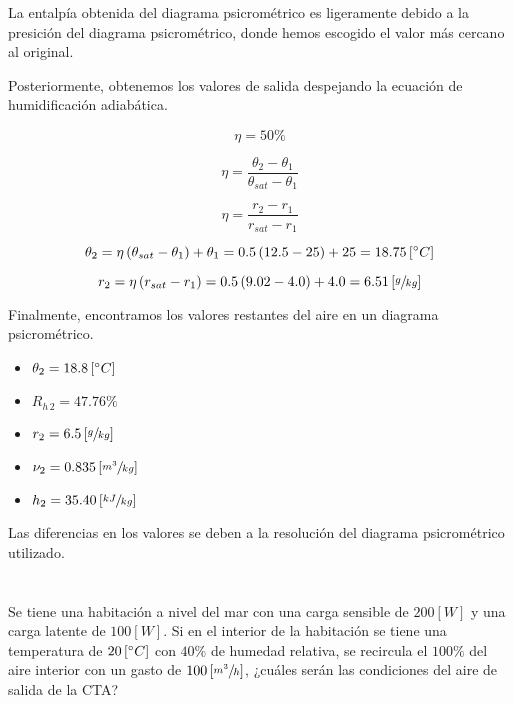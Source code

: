 \documentclass[11pt]{article}
\begin{document}
La entalpía obtenida del diagrama psicrométrico es ligeramente debido a la presición del diagrama psicrométrico, donde hemos escogido el valor más cercano al original.

Posteriormente, obtenemos los valores de salida despejando la ecuación de humidificación adiabática.

\[ \eta = 50 \% \]

\[ \eta = \frac{ \theta _2 - \theta _1 }{ \theta _ { sat } - \theta _1 } \]

\[ \eta = \frac{ r_2 - r_1 }{ r_{ sat } - r_1 } \]

\[ \theta _2 = \eta \left( \theta _{ sat } - \theta _1 \right) + \theta _1 = 0.5 \left( 12.5 - 25 \right) + 25 = 18.75 \left[ \degree C \right] \]

\[ r_2 = \eta \left( r_{ sat } - r_1 \right) = 0.5 \left( 9.02 - 4.0 \right) + 4.0 = 6.51 \left[ \sfrac{ g }{ kg } \right] \]

Finalmente, encontramos los valores restantes del aire en un diagrama psicrométrico.

\begin{itemize}
    \item
    $ \theta _2 = 18.8 \left[ \degree C \right] $
    
    \item
    $ R_{ h \, 2 } = 47.76\% $
    
    \item
    $ r_2 = 6.5 \left[ \sfrac{ g }{ kg } \right] $
    
    \item
    $ \nu_2 = 0.835 \left[ \sfrac{ m^3 }{ kg } \right] $
    
    \item
    $ h_2 = 35.40 \left[ \sfrac{ kJ }{ kg } \right] $

\end{itemize}

Las diferencias en los valores se deben a la resolución del diagrama psicrométrico utilizado.

\section{}

Se tiene una habitación a nivel del mar con una carga sensible de $ 200 \left[ W \right] $ y una carga latente de $ 100 \left[ W \right] $. Si en el interior de la habitación se tiene una temperatura de $ 20 \left[ \degree C \right] $ con $ 40\% $ de humedad relativa, se recircula el $ 100\% $ del aire interior con un gasto de $ 100 \left[ \sfrac{ m^3 }{ h } \right] $, ¿cuáles serán las condiciones del aire de salida de la CTA?
\end{document}
